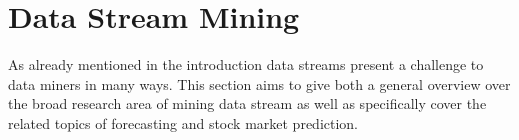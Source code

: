 \section{Data Stream Mining}
\label{sec_streamMining}
As already mentioned in the introduction data streams present a challenge to data miners in many ways. This section aims to give both a general overview over the broad research area of mining data stream as well as specifically cover the related topics of forecasting and stock market prediction.


